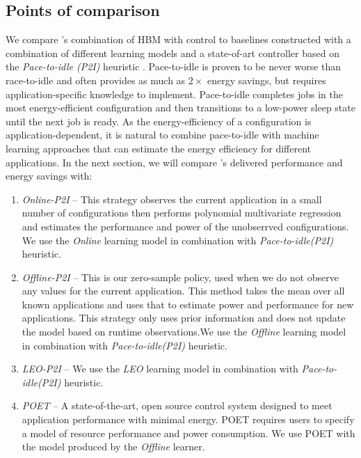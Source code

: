 \subsection{Points of comparison}
We compare \SYSTEM{}'s combination of HBM with control to baselines
constructed with a combination of different learning models and a
state-of-art controller based on the \emph{Pace-to-idle (P2I)}
heuristic \cite{RACINGPACING}.  Pace-to-idle is proven to be never
worse than race-to-idle and often provides as much as $2\times$
energy savings, but requires application-specific knowledge to
implement.  Pace-to-idle completes jobs in the most energy-efficient
configuration and then transitions to a low-power sleep state until
the next job is ready.  As the energy-efficiency of a configuration is
application-dependent, it is natural to combine pace-to-idle with
machine learning approaches that can estimate the energy efficiency
for different applications.  In the next section, we will compare
\SYSTEM{}'s delivered performance and energy savings with:
\begin{enumerate}
\item \textit{Online-P2I} -- This strategy observes the current
  application in a small number of configurations then performs
  polynomial multivariate regression and estimates the performance and
  power of the unobserrved configurations. We use the \textit{Online} learning model
  in combination with \emph{Pace-to-idle(P2I)} heuristic.
\item \textit{Offline-P2I} -- This is our zero-sample policy, used when we
  do not observe any values for the current application. This method
  takes the mean over all known applications and uses that to estimate
  power and performance for new applications.  This strategy only uses
  prior information and does not update the model based on runtime
  observations.We use the \textit{Offline} learning
  model in combination with \emph{Pace-to-idle(P2I)} heuristic.
\item \textit{LEO-P2I} -- We use the \textit{LEO} learning model in
  combination with \emph{Pace-to-idle(P2I)} heuristic.
\item \textit{POET} -- A state-of-the-art, open source control system
  designed to meet application performance with minimal energy.  POET
  requires users to specify a model of resource performance and power
  consumption.  We use POET with the model produced by the
  \emph{Offline} learner.
\end{enumerate}

